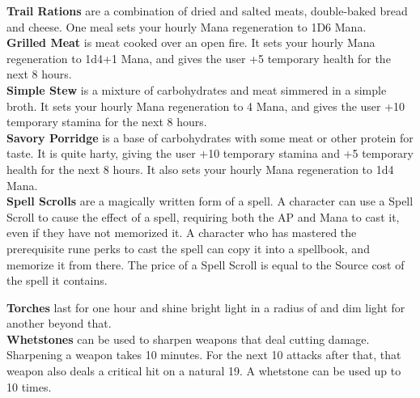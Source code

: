 \textbf{Trail Rations} are a combination of dried and salted meats, double-baked bread and cheese.
One meal sets your hourly Mana regeneration to 1D6 Mana.\\

\textbf{Grilled Meat} is meat cooked over an open fire.
It sets your hourly Mana regeneration to 1d4+1 Mana, and gives the user +5 temporary health for the next 8 hours.\\

\textbf{Simple Stew} is a mixture of carbohydrates and meat simmered in a simple broth.
It sets your hourly Mana regeneration to 4 Mana, and gives the user +10 temporary stamina for the next 8 hours.\\

\textbf{Savory Porridge} is a base of carbohydrates with some meat or other protein for taste.
It is quite harty, giving the user +10 temporary stamina and +5 temporary health for the next 8 hours.
It also sets your hourly Mana regeneration to 1d4 Mana.\\

\textbf{Spell Scrolls} are a magically written form of a spell.
A character can use a Spell Scroll to cause the effect of a spell, requiring both the AP and Mana to cast it, even if they have not memorized it.
A character who has mastered the prerequisite rune perks to cast the spell can copy it into a spellbook, and memorize it from there.
The price of a Spell Scroll is equal to the Source cost of the spell it contains.

\textbf{Torches} last for one hour and shine bright light in a radius of  and dim light for another  beyond that.\\

\textbf{Whetstones} can be used to sharpen weapons that deal cutting damage.
Sharpening a weapon takes 10 minutes.
For the next 10 attacks after that, that weapon also deals a critical hit on a natural 19.
A whetstone can be used up to 10 times.\\